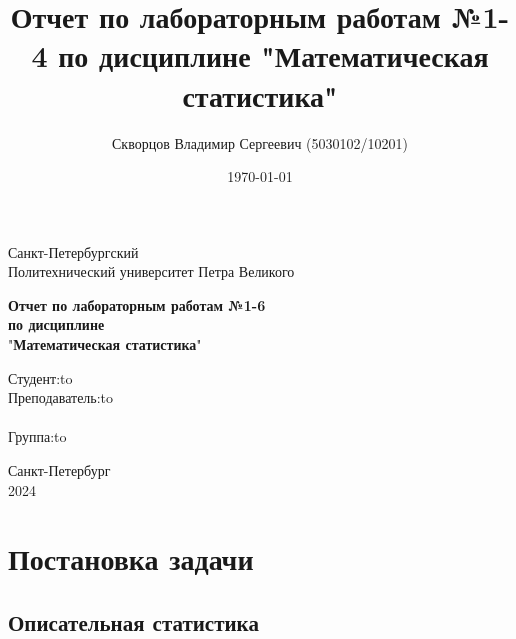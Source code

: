 \documentclass[12pt,a4paper]{article}
\title{Отчет по лабораторным работам №1-4 по дисциплине
	"Математическая статистика"}
\author{Скворцов Владимир Сергеевич (5030102/10201)}
\date{\today}
\begin{document}
	\begin{titlepage}

		\Large

		\begin{center}
			Санкт-Петербургский \\ Политехнический университет Петра Великого

			\vspace{10em}

			\textbf{Отчет по лабораторным работам №1-6} \\
			\textbf{по дисциплине}\\
			"\textbf{Математическая статистика}"

			\vspace{2em}

		\end{center}

		\vspace{6em}

		\newbox{\lbox}
		\newlength{\maxl}
		\setlength{\maxl}{\wd\lbox}
		\hfill\parbox{12cm}{
			\hspace*{3cm}\hspace*{-5cm}Студент:\hfill\hbox to\\
			\hspace*{3cm}\hspace*{-5cm}Преподаватель:\hfill\hbox to\\
			\\
			\hspace*{3cm}\hspace*{-5cm}Группа:\hfill\hbox to\\
		}

		\vspace{\fill}

		\begin{center}
			Санкт-Петербург \\ 2024
		\end{center}

	\end{titlepage}

	\tableofcontents\newpage

	\section{Постановка задачи}

	\subsection{Описательная статистика}
\end{document}

